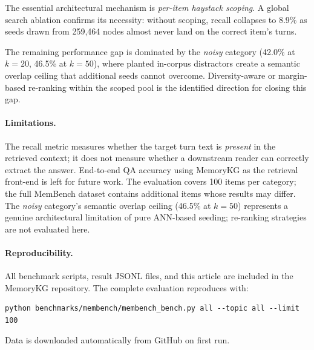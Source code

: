 \documentclass[11pt,a4paper]{article}
\begin{document}
The essential architectural mechanism is \textit{per-item haystack scoping}.
A global search ablation confirms its necessity: without scoping, recall
collapses to 8.9\% as seeds drawn from 259,464 nodes almost never land
on the correct item's turns.

The remaining performance gap is dominated by the \textit{noisy} category
(42.0\% at $k{=}20$, 46.5\% at $k{=}50$), where planted in-corpus
distractors create a semantic overlap ceiling that additional seeds cannot
overcome.
Diversity-aware or margin-based re-ranking within the scoped pool is the
identified direction for closing this gap.

\paragraph{Limitations.}
The recall metric measures whether the target turn text is \emph{present}
in the retrieved context; it does not measure whether a downstream reader
can correctly extract the answer.
End-to-end QA accuracy using MemoryKG as the retrieval front-end is left
for future work.
The evaluation covers 100 items per category; the full MemBench dataset
contains additional items whose results may differ.
The \textit{noisy} category's semantic overlap ceiling (46.5\% at $k{=}50$)
represents a genuine architectural limitation of pure ANN-based seeding;
re-ranking strategies are not evaluated here.

\paragraph{Reproducibility.}
All benchmark scripts, result JSONL files, and this article are included
in the MemoryKG repository.
The complete evaluation reproduces with:
\begin{lstlisting}
python benchmarks/membench/membench_bench.py all --topic all --limit 100
\end{lstlisting}
Data is downloaded automatically from GitHub on first run.
\end{document}
